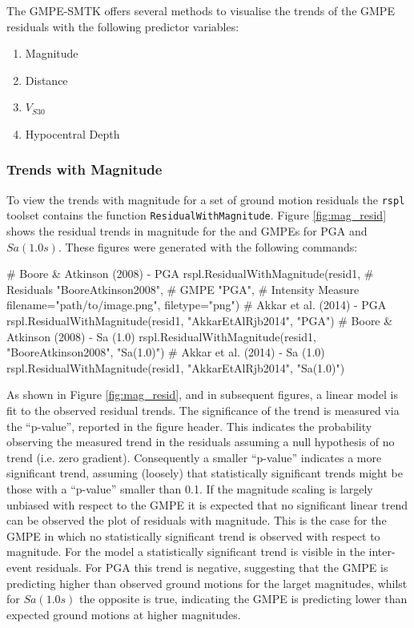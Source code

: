 The GMPE-SMTK offers several methods to visualise the trends of the GMPE residuals with the following predictor variables:
\begin{enumerate}
\item Magnitude
\item Distance
\item $V_{S30}$
\item Hypocentral Depth
\end{enumerate}

\subsubsection{Trends with Magnitude}

To view the trends with magnitude for a set of ground motion residuals the \verb=rspl= toolset contains the function \verb=ResidualWithMagnitude=. Figure \ref{fig:mag_resid} shows the residual trends in magnitude for the \cite{boore2008} and \cite{Akkar_etal2014} GMPEs for PGA and $Sa \left( {1.0 s} \right)$. These figures were generated with the following commands:

\begin{python}[frame=single]
# Boore & Atkinson (2008)  - PGA
rspl.ResidualWithMagnitude(resid1,  # Residuals
                           "BooreAtkinson2008",  # GMPE
                           "PGA",   # Intensity Measure
                           filename="path/to/image.png",
                           filetype="png")
# Akkar et al. (2014)  - PGA
rspl.ResidualWithMagnitude(resid1, "AkkarEtAlRjb2014", "PGA") 
# Boore & Atkinson (2008)  - Sa (1.0)
rspl.ResidualWithMagnitude(resid1, "BooreAtkinson2008",
                          "Sa(1.0)") 
# Akkar et al. (2014)  - Sa (1.0)
rspl.ResidualWithMagnitude(resid1, "AkkarEtAlRjb2014",
                          "Sa(1.0)")                         
\end{python}

As shown in Figure \ref{fig:mag_resid}, and in subsequent figures, a linear model is fit to the observed residual trends. The significance of the trend is measured via the ``p-value'', reported in the figure header. This indicates the probability observing the measured trend in the residuals assuming a null hypothesis of no trend (i.e. zero gradient). Consequently a smaller ``p-value'' indicates a more significant trend, assuming (loosely) that statistically significant trends might be those with a ``p-value'' smaller than 0.1. If the magnitude scaling is largely unbiased with respect to the GMPE it is expected that no significant linear trend can be observed the plot of residuals with magnitude. This is the case for the \cite{Akkar_etal2014} GMPE in which no statistically significant trend is observed with respect to magnitude. For the \cite{boore2008} model a statistically significant trend is visible in the inter-event residuals. For PGA this trend is negative, suggesting that the GMPE is predicting higher than observed ground motions for the larget magnitudes, whilst for $Sa \left( {1.0 s} \right)$ the opposite is true, indicating the GMPE is predicting lower than expected ground motions at higher magnitudes.

